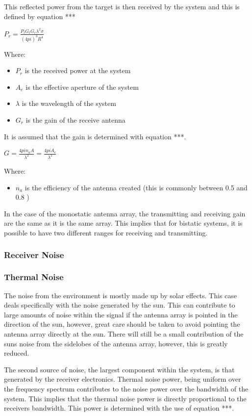 \documentclass[11pt]{witseiepaper}
\begin{document}
This reflected power from the target is then received by the system and this is defined by equation ***

$P_{r} = \frac{P_{t} G_{t} G_{r} \lambda^2 \sigma}{(4 pi )^3 R^4}$

Where:
\begin{itemize}
    \item $P_{r}$ is the received power at the system
    \item $A_{e}$ is the effective aperture of the system
    \item $\lambda$ is the wavelength of the system
    \item $G_{r}$ is the gain of the receive antenna
\end{itemize}

It is assumed that the gain is determined with equation ***.

$G = \frac{4 pi n_{a} A}{\lambda^2} = \frac{4 pi A_{e}}{\lambda^2}$

Where:
\begin{itemize}
    \item $n_{a}$ is the efficiency of the antenna created (this is commonly between 0.5 and 0.8 \cite[p.~64]{radarHandbook})
\end{itemize}

In the case of the monostatic antenna array, the transmitting and receiving gain are the same as it is the same array. This implies that for bistatic systems, it is possible to have two different ranges for receiving and transmitting.


\subsubsection{Receiver Noise}

\subsubsection{Thermal Noise}

The noise from the environment is mostly made up by solar effects. This case deals specifically with the noise generated by the sun. This can contribute to large amounts of noise within the signal if the antenna array is pointed in the direction of the sun, however, great care should be taken to avoid pointing the antenna array directly at the sun. There will still be a small contribution of the suns noise from the sidelobes of the antenna array, however, this is greatly reduced.

The second source of noise, the largest component within the system, is that generated by the receiver electronics.
Thermal noise power, being uniform over the frequency spectrum contributes to the noise power over the bandwidth of the system. This implies that the thermal noise power is directly proportional to the receivers bandwidth. This power is determined with the use of equation ***.
\end{document}
